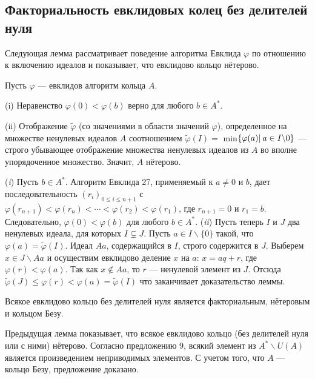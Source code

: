 \subsection{Факториальность евклидовых колец без делителей нуля}
Следующая лемма рассматривает поведение алгоритма Евклида $\varphi$ по отношению к включению идеалов и показывает, что евклидово кольцо нётерово.\newline
\begin{lemma}

\hspace*{15pt}Пусть $\varphi$ — евклидов алгоритм кольца $A$.

(i) Неравенство $\varphi(0) < \varphi(b)$ верно для любого $b \in A^*.$

(ii) Отображение $\tilde{\varphi}$ (со значениями в области значений $\varphi$),  
определенное на множестве ненулевых идеалов $A$ соотношением  $\tilde{\varphi}(I) =$ min$\{\varphi(a)\:\newline |\: a \in I \backslash 0\} $
 — строго убывающее отображение множества 
ненулевых идеалов из $A$ во вполне упорядоченное множество. Значит, $A$ нётерово. 
\end{lemma}
\pagebreak

\begin{myproof}
(\textit{i}) Пусть $b \in A^*$. Алгоритм Евклида 27, применяемый к $a \neq 0$ и $b$, дает последовательность $(r_i)_{0\leqslant i\leqslant n+1}$ с $\varphi(r_{n+1})< \varphi(r_n)< \cdots < \varphi(r_2) <\varphi(r_1)$, где $r_{n+1} = 0$ и $r_1 = b$. Следовательно, $\varphi(0) < \varphi(b)$ для любого $b \in A^*$.\newline
(\textit{ii}) Пусть теперь $I$ и $J$ два ненулевых идеала, для которых $I \subsetneq J$. Пусть $a \in I \backslash  \{0\}$ такой, что $\varphi(a) = \tilde{\varphi}(I)$. Идеал $Aa$, содержащийся в $I$, строго содержится в $J$. Выберем $x \in J \backslash Aa$ и осуществим евклидово деление $x$ на $a$: $x = aq + r$, где $\varphi(r) < \varphi(a)$. Так как $x \notin Aa$, то $r$ — ненулевой элемент из $J$. Отсюда $\tilde{\varphi}(J)\leqslant \varphi(r) < \varphi(a) =\tilde{\varphi}(I)$ что заканчивает доказательство леммы.
\end{myproof}

\begin{predl}
\hspace*{15pt}Всякое евклидово кольцо без делителей нуля является факториальным, нётеровым и кольцом Безу.
\end{predl}


\begin{myproof}
Предыдущая лемма показывает, что всякое евклидово кольцо (без делителей нуля или с ними) нётерово. Согласно предложению 9, всякий элемент из $A^* \backslash U(A)$ является произведением неприводимых элементов. С учетом того, что $A$ — кольцо Безу, предложение доказано.
\end{myproof}

